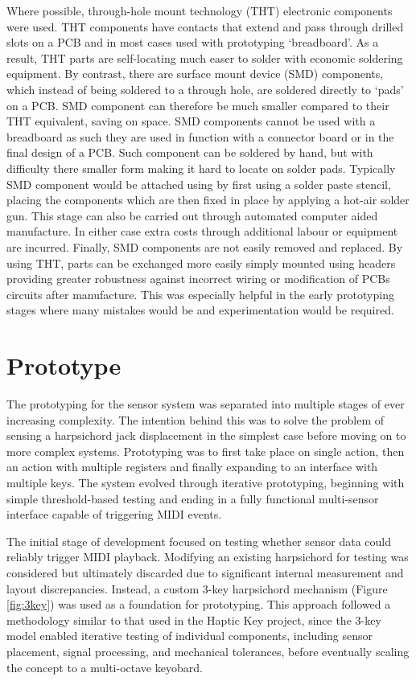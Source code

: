 Where possible, through-hole mount technology (THT) electronic components were used. THT components have contacts that extend and pass through drilled slots on a PCB and in most cases used with prototyping `breadboard'. As a result, THT parts are self-locating much easer to solder with economic soldering equipment. By contrast, there are surface mount device (SMD) components, which instead of being soldered to a through hole, are soldered directly to `pads' on a PCB. SMD component can therefore be much smaller compared to their THT equivalent, saving on space. SMD components cannot be used with a breadboard as such they are used in function with a connector board or in the final design of a PCB. Such component can be soldered by hand, but with difficulty there smaller form making it hard to locate on solder pads. Typically SMD component would be attached using by first using a solder paste stencil, placing the components which are then fixed in place by applying a hot-air solder gun. This stage can also be carried out through automated computer aided manufacture. In either case extra costs through additional labour or equipment are incurred. Finally, SMD components are not easily removed and replaced. By using THT, parts can be exchanged more easily simply mounted using headers providing greater robustness against incorrect wiring or modification of PCBs circuits after manufacture. This was especially helpful in the early prototyping stages where many mistakes would be and experimentation would be required.

\section{Prototype}

The prototyping for the sensor system was separated into multiple stages of ever increasing complexity.
The intention behind this was to solve the problem of sensing a harpsichord jack displacement in the
simplest case before moving on to more complex systems. Prototyping was to first take place on single action, then an action with multiple registers and finally expanding to an interface with multiple keys. 
The system evolved through iterative prototyping, beginning with
simple threshold-based testing and ending in a fully functional multi-sensor
interface capable of triggering MIDI events. 

The initial stage of development focused on testing whether sensor data could
reliably trigger MIDI playback. Modifying an existing harpsichord for testing
was considered but ultimately discarded due to significant internal measurement
and layout discrepancies. Instead, a custom 3-key harpsichord mechanism (Figure
\ref{fig:3key}) was used as a foundation for prototyping. This approach followed
a methodology similar to that used in the \textcite{timmermans_multibody-based_2020} Haptic Key
project, since the 3-key model enabled
iterative testing of individual components, including sensor placement, signal
processing, and mechanical tolerances, before eventually scaling the concept to a multi-octave keyobard. 

